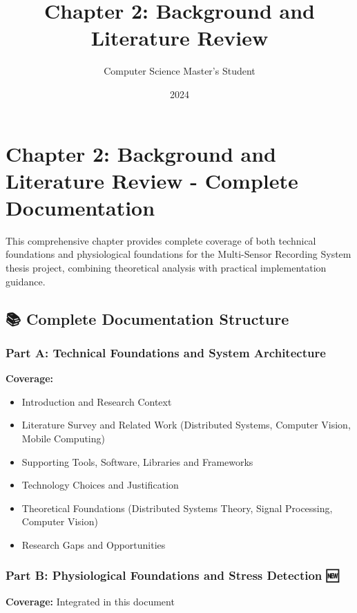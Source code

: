 \documentclass[12pt,a4paper]{article}
\title{Chapter 2: Background and Literature Review}
\author{Computer Science Master's Student}
\date{2024}
\begin{document}
\maketitle

\section{Chapter 2: Background and Literature Review - Complete Documentation}

This comprehensive chapter provides complete coverage of both technical foundations and physiological foundations for
the Multi-Sensor Recording System thesis project, combining theoretical analysis with practical implementation guidance.

\subsection{📚 Complete Documentation Structure}

\subsubsection{Part A: Technical Foundations and System Architecture}

\textbf{Coverage:}

\begin{itemize}
\item Introduction and Research Context
\item Literature Survey and Related Work (Distributed Systems, Computer Vision, Mobile Computing)
\item Supporting Tools, Software, Libraries and Frameworks
\item Technology Choices and Justification
\item Theoretical Foundations (Distributed Systems Theory, Signal Processing, Computer Vision)
\item Research Gaps and Opportunities

\end{itemize}
\subsubsection{Part B: Physiological Foundations and Stress Detection 🆕}

\textbf{Coverage:} Integrated in this document
\end{document}
